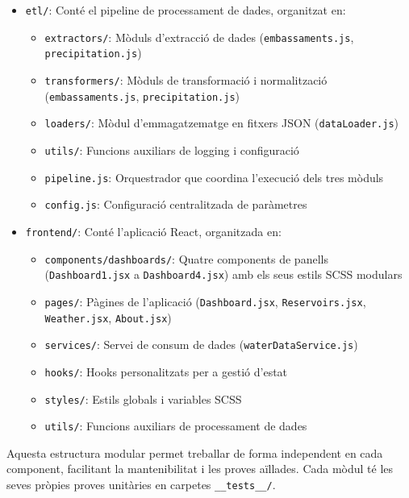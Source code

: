\begin{itemize}
    \item \texttt{etl/}: Conté el pipeline de processament de dades, organitzat en:
    \begin{itemize}
        \item \texttt{extractors/}: Mòduls d'extracció de dades (\texttt{embassaments.js}, \texttt{precipitation.js})
        \item \texttt{transformers/}: Mòduls de transformació i normalització (\texttt{embassaments.js}, \texttt{precipitation.js})
        \item \texttt{loaders/}: Mòdul d'emmagatzematge en fitxers JSON (\texttt{dataLoader.js})
        \item \texttt{utils/}: Funcions auxiliars de logging i configuració
        \item \texttt{pipeline.js}: Orquestrador que coordina l'execució dels tres mòduls
        \item \texttt{config.js}: Configuració centralitzada de paràmetres
    \end{itemize}
    
    \item \texttt{frontend/}: Conté l'aplicació React, organitzada en:
    \begin{itemize}
        \item \texttt{components/dashboards/}: Quatre components de panells (\texttt{Dashboard1.jsx} a \texttt{Dashboard4.jsx}) amb els seus estils SCSS modulars
        \item \texttt{pages/}: Pàgines de l'aplicació (\texttt{Dashboard.jsx}, \texttt{Reservoirs.jsx}, \texttt{Weather.jsx}, \texttt{About.jsx})
        \item \texttt{services/}: Servei de consum de dades (\texttt{waterDataService.js})
        \item \texttt{hooks/}: Hooks personalitzats per a gestió d'estat
        \item \texttt{styles/}: Estils globals i variables SCSS
        \item \texttt{utils/}: Funcions auxiliars de processament de dades
    \end{itemize}
\end{itemize}

Aquesta estructura modular permet treballar de forma independent en cada component, facilitant la mantenibilitat i les proves aïllades. Cada mòdul té les seves pròpies proves unitàries en carpetes \texttt{\_\_tests\_\_/}.

